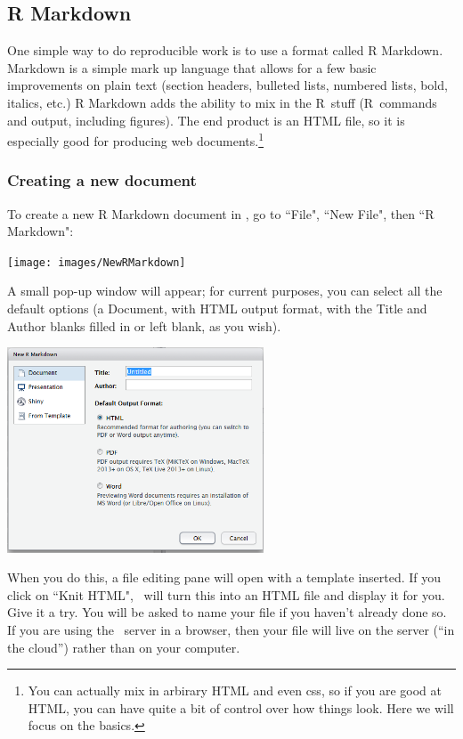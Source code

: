 \documentclass[twoside]{book}\usepackage[]{graphicx}\usepackage[]{xcolor}
\def\R{{\sf R}}
\begin{document}
\subsection{R Markdown}
One simple way to do reproducible work is to use a format called R Markdown.
Markdown is a simple
mark up language that allows for a few basic improvements on plain text
(section headers, bulleted lists, numbered lists, bold, italics, etc.)  R
Markdown adds the ability to mix in the \R\ stuff (\R\ commands and output,
including figures).  
The end product is an HTML file, so it is especially good for producing web 
documents.\footnote{You can actually mix in arbirary HTML and even css, so if you
are good at HTML, you can have quite a bit of control over how things look.  Here we
will focus on the basics.}

\subsubsection{Creating a new document}
To create a new R Markdown document in \RStudio, go to ``File", ``New File", then ``R Markdown":
\begin{center}
	\texttt{[image: images/NewRMarkdown]}
\end{center}

A small pop-up window will appear; for current purposes, you can select all the default
options (a Document, with HTML output format, with the Title and Author blanks
filled in or left blank, as you wish).
\begin{center}
  \includegraphics[width=3in]{images/NewRMarkdownPopup}
\end{center}

When you do this, a file editing pane will open with a template inserted.  If
you click on ``Knit HTML", \RStudio\ will turn this into an HTML file and
display it for you.  Give it a try.  You will be asked to name your file if you
haven't already done so.  If you are using the \RStudio\ server in a browser,
then your file will live on the server (``in the cloud'') rather than on your
computer.
\end{document}

